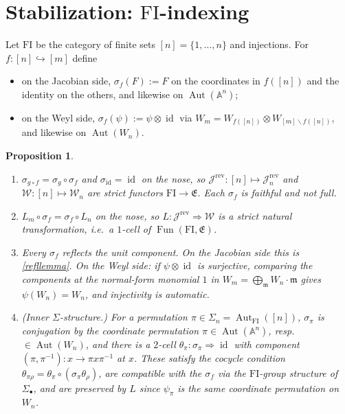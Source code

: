 \documentclass[11pt]{article}
\theoremstyle{change}
\newtheorem{prop}[equation]{Proposition}
\theoremstyle{nonumberplain}
\renewcommand\AA{{\mathbb A}}
\newcommand\cJ{{\mathcal J}}
\newcommand\cW{{\mathcal W}}
\newcommand\fE{{\mathfrak E}}
\newcommand\mono{\hookrightarrow}
\newcommand\sminus{\smallsetminus}
\newcommand\setof[1]{\{ #1 \}}
\newcommand\rev{{\mathrm{rev}}}
\newcommand\FI{{\mathrm{FI}}}
\DeclareMathOperator{\Aut}{Aut}
\DeclareMathOperator{\id}{id}
\DeclareMathOperator{\Fun}{Fun}
\begin{document}
\section{Stabilization: $\FI$-indexing\label{FIsec}}

Let $\FI$ be the category of finite sets $[n] = \setof{1, \dots, n}$ and injections. For $f : [n] \mono [m]$ define
\begin{itemize}
\item on the Jacobian side, $\sigma_f(F) := F$ on the coordinates in $f([n])$ and the identity on the others, and likewise on $\Aut(\AA^n)$;
\item on the Weyl side, $\sigma_f(\psi) := \psi \otimes \id$ via $W_m = W_{f([n])} \otimes W_{[m] \sminus f([n])}$, and likewise on $\Aut(W_n)$.
\end{itemize}

\begin{prop}\label{FIprop}
\begin{enumerate}
\item $\sigma_{g \circ f} = \sigma_g \circ \sigma_f$ and $\sigma_{\id} = \id$ on the nose, so $\cJ^\rev : [n] \mapsto \cJ^\rev_n$ and $\cW : [n] \mapsto \cW_n$ are strict functors $\FI \to \fE$. Each $\sigma_f$ is faithful and not full.
\item $L_m \circ \sigma_f = \sigma_f \circ L_n$ on the nose, so $L : \cJ^\rev \Rightarrow \cW$ is a strict natural transformation, i.e.\ a $1$-cell of $\Fun(\FI, \fE)$.
\item Every $\sigma_f$ reflects the unit component. On the Jacobian side this is \cref{refllemma}. On the Weyl side: if $\psi \otimes \id$ is surjective, comparing the components at the normal-form monomial $1$ in $W_m = \bigoplus_{\mathfrak m} W_n \cdot \mathfrak m$ gives $\psi(W_n) = W_n$, and injectivity is automatic.
\item (Inner $\Sigma$-structure.) For a permutation $\pi \in \Sigma_n = \Aut_\FI([n])$, $\sigma_\pi$ is conjugation by the coordinate permutation $\pi \in \Aut(\AA^n)$, resp.\ $\in \Aut(W_n)$, and there is a $2$-cell $\theta_\pi : \sigma_\pi \Rightarrow \id$ with component $(\pi, \pi^{-1}) : x \to \pi x \pi^{-1}$ at $x$. These satisfy the cocycle condition $\theta_{\pi\rho} = \theta_\pi \circ (\sigma_\pi \theta_\rho)$, are compatible with the $\sigma_f$ via the $\FI$-group structure of $\Sigma_\bullet$, and are preserved by $L$ since $\psi_\pi$ is the same coordinate permutation on $W_n$.
\end{enumerate}
\end{prop}
\end{document}
